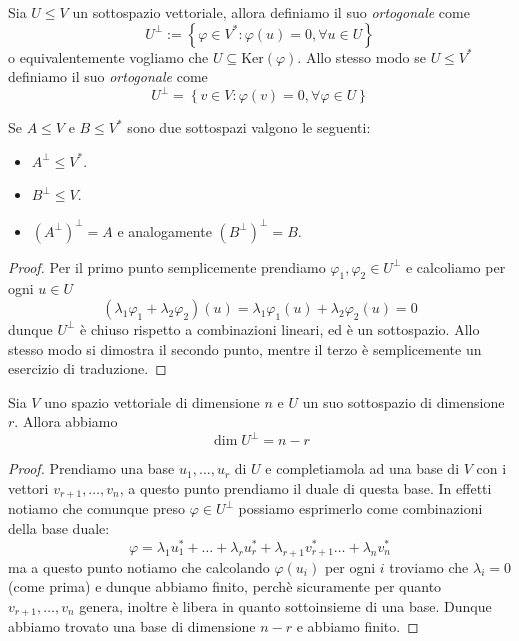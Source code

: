 \documentclass[11pt]{scrartcl}
\renewcommand{\ker}[1]{\text{Ker}\left(#1\right)}
\begin{document}
  	 \begin{definition}
  	 	Sia $U\le V$ un sottospazio vettoriale, allora definiamo il suo \textit{ortogonale} come
  	 	$$U^{\perp}:=\left\{\varphi\in V^*:\varphi(u)=0,\forall u\in U\right\}$$
  	 	o equivalentemente vogliamo che $U\subseteq \ker{\varphi}$. Allo stesso modo se $U\le V^*$ definiamo il suo \textit{ortogonale} come
  	 	$$U^\perp=\left\{v\in V:\varphi(v)=0,\forall \varphi\in U\right\}$$ 
  	 \end{definition}
  	 \begin{lemma}
  	 	Se $A\le V$ e $B\le V^*$ sono due sottospazi valgono le seguenti:
  	 	\begin{itemize}
  	 		\item $A^\perp\le V^*$.
  	 		\item $B^\perp\le V$.
  	 		\item $(A^\perp)^\perp=A$ e analogamente $(B^\perp)^\perp=B$.
  	 	\end{itemize}
  	 \end{lemma}
  	 \begin{proof}
  	 	Per il primo punto semplicemente prendiamo $\varphi_1,\varphi_2\in U^\perp$ e calcoliamo per ogni $u\in U$
  	 	$$(\lambda_1\varphi_1+\lambda_2\varphi_2)(u)=\lambda_1\varphi_1(u)+\lambda_2\varphi_2(u)=0$$
  	 	dunque $U^\perp$ è chiuso rispetto a combinazioni lineari, ed è un sottospazio. Allo stesso modo si dimostra il secondo punto, mentre il terzo è semplicemente un esercizio di traduzione.
  	 \end{proof}
  	 \begin{theorem}
  	 	Sia $V$ uno spazio vettoriale di dimensione $n$ e $U$ un suo sottospazio di dimensione $r$. Allora abbiamo
  	 	$$\dim U^\perp=n-r$$
  	 \end{theorem}
  	 \begin{proof}
  	 	Prendiamo una base $u_1,\dots,u_r$ di $U$ e completiamola ad una base di $V$ con i vettori $v_{r+1},\dots,v_{n}$, a questo punto prendiamo il duale di questa base. In effetti notiamo che comunque preso $\varphi\in U^\perp$ possiamo esprimerlo come combinazioni della base duale:
  	 	$$\varphi=\lambda_1u_1^*+\dots+\lambda_r u_r^*+\lambda_{r+1}v^*_{r+1}\dots +\lambda_n v_n^*$$
  	 	ma a questo punto notiamo che calcolando $\varphi(u_i)$ per ogni $i$ troviamo che $\lambda_i=0$ (come prima) e dunque abbiamo finito, perchè sicuramente per quanto $v_{r+1},\dots,v_n$ genera, inoltre è libera in quanto sottoinsieme di una base. Dunque abbiamo trovato una base di dimensione $n-r$ e abbiamo finito.
   	 \end{proof}
   	 
\end{document}
